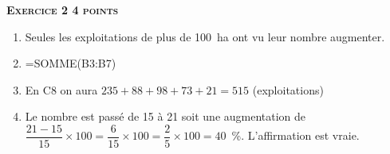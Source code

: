 \textbf{\textsc{Exercice 2 \hfill 4 points}}

\medskip

%

\begin{enumerate}
\item %
Seules les exploitations de plus de 100~ha ont vu leur nombre augmenter.
\item %
=SOMME(B3:B7)
\item %
En C8 on aura $235 + 88 + 98 + 73 + 21 = 515$ (exploitations)
\item %
Le nombre est passé de 15 à 21 soit une augmentation de $\dfrac{21 - 15}{15} \times 100 = \dfrac{6}{15}\times 100 = \dfrac{2}{5} \times 100 = 40$~\%. L'affirmation est vraie.
\end{enumerate} 

\vspace{0,5cm}


